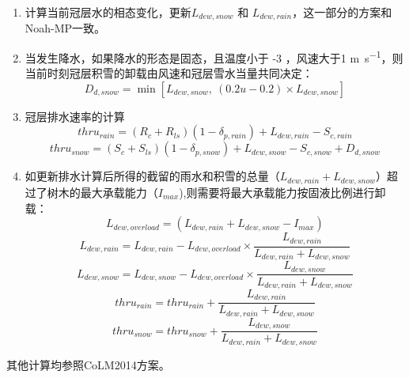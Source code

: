 \begin{enumerate}
\item 计算当前冠层水的相态变化，更新$L_{dew,snow}$ 和 $L_{dew,rain}$，这一部分的方案和Noah-MP一致。

\item 当发生降水，如果降水的形态是固态，且温度小于 -3 \textcelsius ，风速大于1 \unit{m.s^{-1}}，则当前时刻冠层积雪的卸载由风速和冠层雪水当量共同决定：
\begin{equation}
D_{d,snow} = \min\left[L_{dew,snow},\ (0.2u-0.2) \times L_{dew,snow}\right]
\end{equation}

\item 冠层排水速率的计算
\begin{equation}
thru_{rain}=\left(R_{c}+R_{ls}\right)\left(1-\delta_{p,rain}\right)+L_{dew,rain}-S_{c,rain}
\end{equation}
\begin{equation}
thru_{snow}=\left(S_{c}+S_{ls}\right)\left(1-\delta_{p,snow}\right)+L_{dew,snow}-S_{c,snow}+D_{d,snow}
\end{equation}

\item 如更新排水计算后所得的截留的雨水和积雪的总量（$L_{dew,rain}+L_{dew,snow}$）超过了树木的最大承载能力（$I_{max}$),则需要将最大承载能力按固液比例进行卸载：
\begin{equation}
L_{dew,overload}=(L_{dew,rain}+L_{dew,snow}-I_{max})
\end{equation}
\begin{equation}
L_{dew,rain}=L_{dew,rain} - L_{dew,overload} \times \frac{L_{dew,rain}}{L_{dew,rain}+L_{dew,snow}}
\end{equation}
\begin{equation}
L_{dew,snow}=L_{dew,snow} - L_{dew,overload} \times   \frac{L_{dew,snow}}{L_{dew,rain}+L_{dew,snow}}
\end{equation}
\begin{equation}
thru_{rain}=thru_{rain} + \frac{L_{dew,rain}}{L_{dew,rain}+L_{dew,snow}}
\end{equation}
\begin{equation}
thru_{snow}=thru_{snow} + \frac{L_{dew,snow}}{L_{dew,rain}+L_{dew,snow}}
\end{equation}
\end{enumerate}
其他计算均参照CoLM2014方案。


